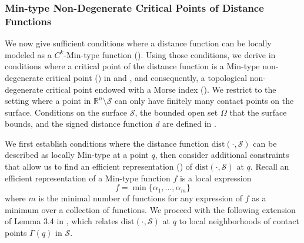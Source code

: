 \documentclass[11pt]{article}
\newcommand{\R}{\mathbb{R}}
\newcommand{\W}{\Omega}
\newcommand{\dist}{\mathrm{dist}}
\newcommand{\Surf}{\mathcal{S}}
\theoremstyle{plain}
\theoremstyle{definition}
\theoremstyle{remark}
\begin{document}
	
	\subsubsection{Min-type Non-Degenerate Critical Points of Distance Functions}
	\label{sec:NDG_crit_pts_dist_functions}
	
	We now give sufficient conditions where a distance function can be locally modeled as a $C^k$-Min-type function (). Using those conditions, we derive in conditions where a critical point of the distance function is a Min-type non-degenerate critical point () in  and , and consequently, a topological non-degenerate critical point endowed with a Morse index (). We restrict to the setting where a point in $\R^n \setminus \Surf$ can only have finitely many contact points on the surface. Conditions on the surface $\Surf$, the bounded open set $\W$ that the surface bounds, and the signed distance function $d$ are defined in . 
	
	
	We first establish conditions where the distance function $\dist(\cdot, \Surf)$ can be described as locally Min-type at a point $q$, then consider additional constraints that allow us to find an efficient representation () of $\dist(\cdot, \Surf)$ at $q$. Recall an efficient representation of a Min-type function $f$ is a local expression
	\[ f = \min \{\alpha_1, \ldots,  \alpha_m\}\]
	where $m$ is the minimal number of functions for any expression of $f$ as a minimum over a collection of functions. We proceed with the following extension of Lemma 3.4 in \cite{birbrair_medial_2017}, which relates $\dist(\cdot, \Surf)$ at $q$ to local neighborhoods of contact points $\Gamma(q)$ in $\Surf$.
	
\end{document}
